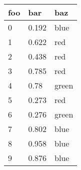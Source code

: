 \begin{tabular}{l l l}
foo & bar & baz \\
\hline
0 & 0.192 & blue \\
1 & 0.622 & red \\
2 & 0.438 & red \\
3 & 0.785 & red \\
4 & 0.78 & green \\
5 & 0.273 & red \\
6 & 0.276 & green \\
7 & 0.802 & blue \\
8 & 0.958 & blue \\
9 & 0.876 & blue \\
\end{tabular}
